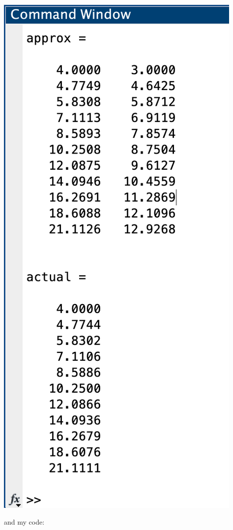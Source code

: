 \documentclass{article}
\begin{document}
\begin{answer}
\begin{center}
                \includegraphics[scale=0.5]{q2}
            \end{center}
        and my code:
        \inputminted{matlab}{./code/RKsystem.m}
        \inputminted{matlab}{./code/q2f1.m}
        \inputminted{matlab}{./code/q2f2.m}
        \inputminted{matlab}{./code/q2actf1.m}
        \inputminted{matlab}{./code/evalAct.m}
        \inputminted{matlab}{./code/script2.m}
    \end{answer}
\end{document}
